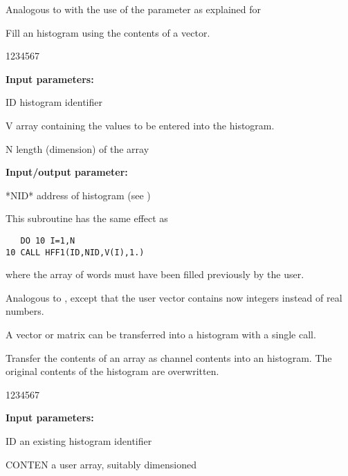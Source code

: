  
\Action Analogous to  with the use of the parameter
 as explained for 
 
 
 
\Action Fill an histogram using the contents of a vector.
 
\begin{DLtt}{1234567}
\item[{\rm\bf Input parameters:}]
\item[ID] histogram identifier
\item[V] array containing the values to be entered into the histogram.
\item[N] length (dimension) of the array 
\item[{\rm\bf Input/output parameter:}]
\item[*NID*] address of histogram (see )
\end{DLtt}
 
This subroutine has the same effect as
 
\begin{verbatim}
   DO 10 I=1,N
10 CALL HFF1(ID,NID,V(I),1.)
\end{verbatim}
 
where the array  of  words must have been filled
previously by the user.
\medskip
 
 
 
\Action 
Analogous to , except that the user vector contains now
integers instead of real numbers.
 
 
A vector or matrix can be transferred into a histogram with a single call.
 
 
 
\Action 
Transfer the contents of an array as channel contents into an
histogram. The original contents of the histogram are overwritten.
 
\begin{DLtt}{1234567}
\item[{\rm\bf Input parameters:}]
\item[ID] an existing histogram identifier
\item[CONTEN] a user array, suitably dimensioned
\end{DLtt}
 

